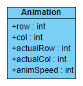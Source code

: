 \documentclass[12pt, openany]{report}
\begin{document}
\hfill
\begin{minipage}{.35\textwidth}
\includegraphics[width=\textwidth]{animation.png}
\end{minipage}
\vspace{0.3cm}
\noindent
\end{document}
